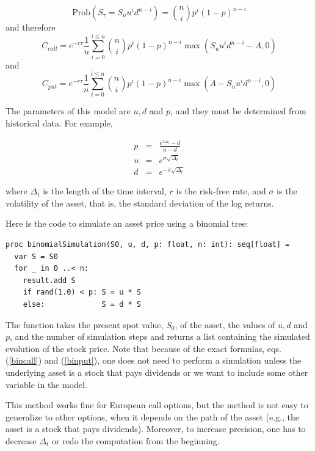 \documentclass[justified, sixbynine]{tufte-book}
\theoremstyle{plain}%
\newtheorem * {corollary}{Corollary}
\theoremstyle{definition}
\theoremstyle{remark}
\newtheorem * {remark}{Remark}
\newtheorem * {note}{Note}
\begin{document}
\begin{fullwidth}
\begin{equation}
\textrm{Prob}(S_\tau =S_uu^id^{n-i})=\binom nip^i(1-p)^{n-i}
\end{equation}
and therefore
\begin{equation}
C_{call}=e^{-r\tau }\frac 1n\sum_{i=0}^{i\leq n}\binom nip^i(1-p)^{n-i}\max
(S_uu^id^{n-i}-A, 0)  \label{bincall}
\end{equation}
and
\begin{equation}
C_{put}=e^{-r\tau }\frac 1n\sum_{i=0}^{i\leq n}\binom nip^i(1-p)^{n-i}\max
(A-S_uu^id^{n-i}, 0)  \label{binput}
\end{equation}

The parameters of this model are $u, d$ and $p$, and they must be determined
from historical data. For example, 

\begin{eqnarray}
p &=& \frac{e^{r\Delta_t} - d}{u-d} \\
u &=& e^{\sigma\sqrt{\Delta_t}} \\
d &=& e^{-\sigma\sqrt{\Delta_t}}
\end{eqnarray}

where $\Delta_t$ is the length of the time interval, $r$ is the risk-free rate, and $\sigma$ is the volatility of the asset, that is, the standard deviation of the log returns.

Here is the code to simulate an asset price using a binomial tree:
\begin{lstlisting}
proc binomialSimulation(S0, u, d, p: float, n: int): seq[float] =
  var S = S0
  for _ in 0 ..< n:
    result.add S
    if rand(1.0) < p: S = u * S
    else:             S = d * S
\end{lstlisting}

The function takes the present spot value, $S_0$, of the asset, the values
of $u, d$ and $p$, and the number of simulation steps and returns a list
containing the simulated evolution of the stock price. Note that because of
the exact formulas, eqs.(\ref{bincall}) and (\ref{binput}), one does not need
to perform a simulation unless the underlying asset is a stock that pays
dividends or we want to include some other variable in the model.

This method works fine for European call options, but the method is not easy to
generalize to other options, when it depends on the path of
the asset (e.g., the asset is a stock that pays dividends). Moreover, 
to increase precision, one has to decrease $\Delta _t$ or redo the
computation from the beginning.


\end{fullwidth}
\end{document}
